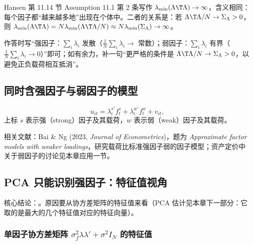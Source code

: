 Hansen 第 11.14 节 Assumption 11.1 第 2 条写作 $\lambda_{\min}(\Lambda\T\Lambda)\to\infty$，含义相同：每个因子都“越来越多地”出现在个体中。二者的关系是：若 $\Lambda\T\Lambda/N\to\Sigma_\Lambda>0$，则 $\lambda_{\min}(\Lambda\T\Lambda)=N\lambda_{\min}(\Lambda\T\Lambda/N)\approx N\lambda_{\min}(\Sigma_\Lambda)\to\infty$。

\begin{note}[作答建议]
作答时写“强因子：$\sum_i\lambda_i$ 发散（$\frac1N\sum_i\lambda_i\to$ 常数）；弱因子：$\sum_i\lambda_i$ 有界（$\frac1N\sum_i\lambda_i\to0$）”即可；如有余力，补一句“更严格的条件是 $\Lambda\T\Lambda/N\to\Sigma_\Lambda>0$，以避免正负载荷相互抵消”。
\end{note}

\subsection{同时含强因子与弱因子的模型}

\begin{defn}[含强、弱因子的模型]\label{def:U13a-sw-model}
\[
u_{it}=\lambda_i^{s\prime}f_t^s+\lambda_i^{w\prime}f_t^w+v_{it},
\]
上标 $s$ 表示强（strong）因子及其载荷，$w$ 表示弱（weak）因子及其载荷。
\end{defn}

相关文献：Bai \& Ng (2023, \emph{Journal of Econometrics})，题为 \emph{Approximate factor models with weaker loadings}，研究载荷比标准强因子弱的因子模型；资产定价中关于弱因子的讨论见本章应用一节。

\subsection{PCA 只能识别强因子：特征值视角}

核心结论：。原因要从协方差矩阵的特征值来看（PCA 估计见本章下一部分：它取的是最大的几个特征值对应的特征向量）。

\subsubsection{单因子协方差矩阵 \texorpdfstring{$\sigma_f^2\lambda\lambda'+\sigma^2I_N$}{sigma\_f\^{}2 lambda lambda' + sigma\^{}2 I} 的特征值}

